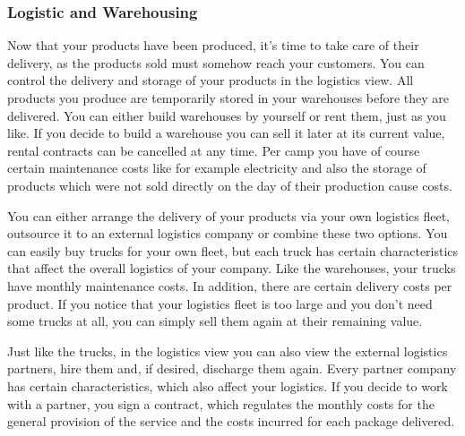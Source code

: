 \subsubsection{Logistic and Warehousing}
Now that your products have been produced, it's time to take care of their delivery, as the products sold must somehow reach your customers. You can control the delivery and storage of your products in the logistics view. 
All products you produce are temporarily stored in your warehouses before they are delivered. You can either build warehouses by yourself or rent them, just as you like. If you decide to build a warehouse you can sell it later at its current value, rental contracts can be cancelled at any time. Per camp you have of course certain maintenance costs like for example electricity and also the storage of products which were not sold directly on the day of their production cause costs.

You can either arrange the delivery of your products via your own logistics fleet, outsource it to an external logistics company or combine these two options. You can easily buy trucks for your own fleet, but each truck has certain characteristics that affect the overall logistics of your company. Like the warehouses, your trucks have monthly maintenance costs. In addition, there are certain delivery costs per product. If you notice that your logistics fleet is too large and you don't need some trucks at all, you can simply sell them again at their remaining value.

Just like the trucks, in the logistics view you can also view the external logistics partners, hire them and, if desired, discharge them again. Every partner company has certain characteristics, which also affect your logistics. If you decide to work with a partner, you sign a contract, which regulates the monthly costs for the general provision of the service and the costs incurred for each package delivered. 
